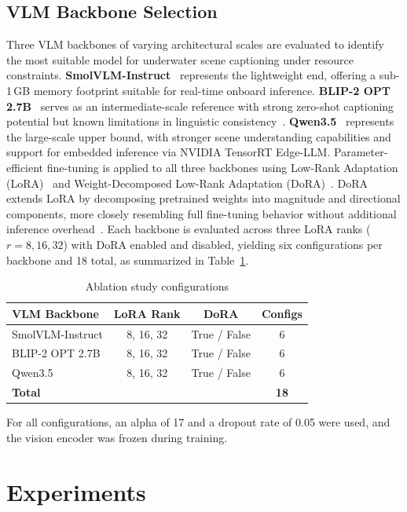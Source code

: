 \subsection*{VLM Backbone Selection}
\label{sec:backbone}
Three VLM backbones of varying architectural scales are evaluated to identify the most suitable model for underwater scene captioning under resource constraints. \textbf{SmolVLM-Instruct}~\cite{marafioti4} represents the lightweight end, offering a sub-1\,GB memory footprint suitable for real-time onboard inference. \textbf{BLIP-2 OPT 2.7B}~\cite{blip2} serves as an intermediate-scale reference with strong zero-shot captioning potential but known limitations in linguistic consistency~\cite{hani2026systematic}. \textbf{Qwen3.5}~\cite{tensorrt} represents the large-scale upper bound, with stronger scene understanding capabilities and support for embedded inference via NVIDIA TensorRT Edge-LLM. Parameter-efficient fine-tuning is applied to all three backbones using Low-Rank Adaptation (LoRA)~\cite{lora} and Weight-Decomposed Low-Rank Adaptation (DoRA)~\cite{dora}. DoRA extends LoRA by decomposing pretrained weights into magnitude and directional components, more closely resembling full fine-tuning behavior without additional inference overhead~\cite{dora}. Each backbone is evaluated across three LoRA ranks ($r = 8, 16, 32$) with DoRA enabled and disabled, yielding six configurations per backbone and 18 total, as summarized in Table~\ref{tab:ablation}.

\begin{table}[h]
\centering
\caption{Ablation study configurations}
\label{tab:ablation}
\begin{tabular}{lccc}
\hline
\textbf{VLM Backbone} & \textbf{LoRA Rank} & \textbf{DoRA} & \textbf{Configs} \\
\hline
SmolVLM-Instruct  & 8, 16, 32 & True / False & 6 \\
BLIP-2 OPT 2.7B   & 8, 16, 32 & True / False & 6 \\
Qwen3.5           & 8, 16, 32 & True / False & 6 \\
\hline
\textbf{Total}    &           &              & \textbf{18} \\
\hline
\end{tabular}
\end{table}

For all configurations, an alpha of 17 and a dropout rate of 0.05 were used, and the vision encoder was frozen during training.

\section{Experiments}

